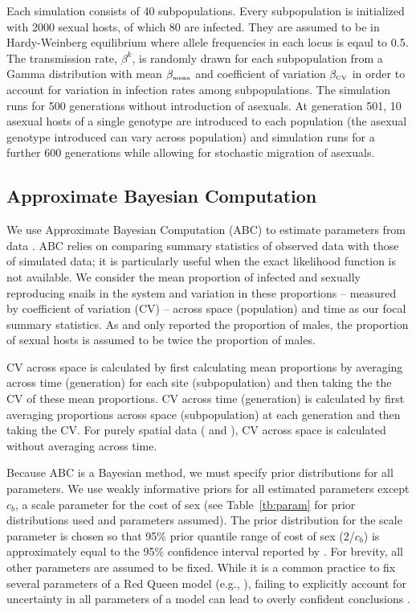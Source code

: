 \documentclass{article}\usepackage[]{graphicx}\usepackage[]{color}
\begin{document}
Each simulation consists of 40 subpopulations. Every subpopulation is initialized with 2000 sexual hosts, of which 80 are infected. 
They are assumed to be in Hardy-Weinberg equilibrium where allele frequencies in each locus is eqaul to 0.5. 
The transmission rate, $\beta^k$, is randomly drawn for each subpopulation from a Gamma distribution with mean $\beta_{\textrm{\tiny mean}}$ and coefficient of variation $\beta_{\textrm{\tiny CV}}$ in order to account for variation in infection rates among subpopulations. 
The simulation runs for 500 generations without introduction of asexuals. At generation 501, 10 asexual hosts of a single genotype are introduced to each population (the asexual genotype introduced can vary across population) and simulation runs for a further 600 generations while allowing for stochastic migration of asexuals.

\subsection{Approximate Bayesian Computation}

We use Approximate Bayesian Computation (ABC) to estimate parameters from data \citep{toni2009approximate}.
ABC relies on comparing summary statistics of observed data with those of simulated data; it is particularly useful when the exact likelihood function is not available.
We consider the mean proportion of infected and sexually reproducing snails in the system and variation in these proportions -- measured by coefficient of variation (CV) -- across space (population) and time as our focal summary statistics.
As \cite{dagan2013clonal} and \cite{mckone2016fine} only reported the proportion of males, the proportion of sexual hosts is assumed to be twice the proportion of males.

CV across space is calculated by first calculating mean proportions by averaging across time (generation) for each site (subpopulation) and then taking the the CV of these mean proportions.
CV across time (generation) is calculated by first averaging proportions across space (subpopulation) at each generation and then taking the CV.
For purely spatial data (\cite{dagan2013clonal} and \cite{mckone2016fine}), CV across space is calculated without averaging across time.

Because ABC is a Bayesian method, we must specify prior distributions for all parameters.
We use weakly informative priors for all estimated parameters except $c_b$, a scale parameter for the cost of sex (see Table~\ref{tb:param} for prior distributions used and parameters assumed).
The prior distribution for the scale parameter is chosen so that 95\% prior quantile range of cost of sex (2/$c_b$) is approximately equal to the 95\% confidence interval reported by \cite{gibson2017two}.
For brevity, all other parameters are assumed to be fixed.
While it is a common practice to fix several parameters of a Red Queen model (e.g., \cite{lively2010epidemiological, ashby2015diversity, haafke2016eco, ashby2019understanding}), failing to explicitly account for uncertainty in all parameters of a model can lead to overly confident conclusions \citep{elderd2006uncertainty}.
\end{document}
